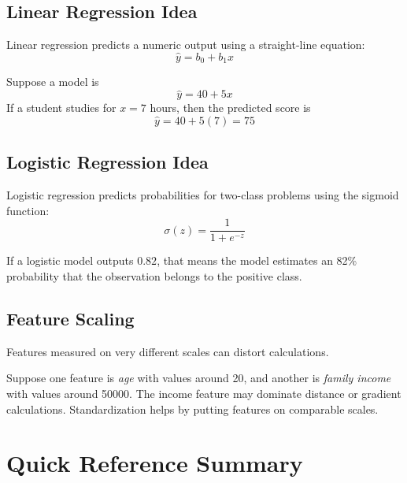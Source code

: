 \documentclass[11pt,a4paper]{article}
\begin{document}
\subsection{Linear Regression Idea}

Linear regression predicts a numeric output using a straight-line equation:
\[
\hat{y} = b_0 + b_1x
\]

\begin{examplebox}
Suppose a model is
\[
\hat{y} = 40 + 5x
\]
If a student studies for $x = 7$ hours, then the predicted score is
\[
\hat{y} = 40 + 5(7) = 75
\]
\end{examplebox}

\subsection{Logistic Regression Idea}

Logistic regression predicts probabilities for two-class problems using the sigmoid function:
\[
\sigma(z) = \frac{1}{1 + e^{-z}}
\]

\begin{examplebox}
If a logistic model outputs $0.82$, that means the model estimates an 82\% probability that the observation belongs to the positive class.
\end{examplebox}

\subsection{Feature Scaling}

Features measured on very different scales can distort calculations.

\begin{examplebox}
Suppose one feature is \emph{age} with values around 20, and another is \emph{family income} with values around 50000. The income feature may dominate distance or gradient calculations. Standardization helps by putting features on comparable scales.
\end{examplebox}

\section{Quick Reference Summary}
\end{document}
